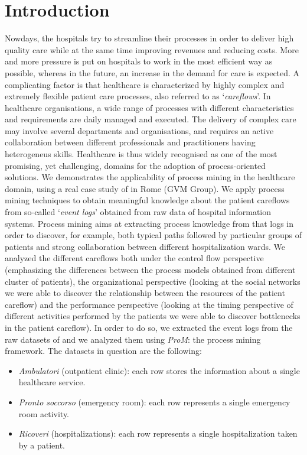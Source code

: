 \section{Introduction}
Nowdays, the hospitals try to streamline their processes in order to deliver high quality care while at the same time improving revenues and reducing costs. More and more pressure is put on hospitals to work in the most efficient way as possible, whereas in the future, an increase in the demand for care is expected. A complicating factor is that healthcare is characterized by highly complex and extremely flexible patient care processes, also referred to as `\textit{careflows}'. In healthcare organisations, a wide range of processes with different characteristics and requirements are daily managed and executed. The delivery of complex care may involve several departments and organisations, and requires an active collaboration between different professionals and practitioners having heterogeneus skills. Healthcare is thus widely recognised as one of the most promising, yet challenging, domains for the adoption of process-oriented solutions. We demonstrates the applicability of process mining in the healthcare domain, using a real case study of \hospital in Rome (GVM Group). We apply process mining techniques to obtain meaningful knowledge about the patient careflows from so-called `\textit{event logs}' obtained from raw data of hospital information systems. Process mining aims at extracting process knowledge from that logs in order to discover, for example, both typical paths followed by particular groups of patients and strong collaboration between different hospitalization wards. We analyzed the different careflows both under the control flow perspective (emphasizing the differences between the process models obtained from different cluster of patients), the organizational perspective (looking at the social networks we were able to discover the relationship between the resources of the patient careflow) and the performance perspective (looking at the timing perspective of different activities performed by the patients we were able to discover bottlenecks in the patient careflow). In order to do so, we extracted the event logs from the raw datasets of \hospital and we analyzed them using \textit{ProM}: the process mining framework. The datasets in question are the following:
\begin{itemize}
\item \textit{Ambulatori} (outpatient clinic): each row stores the information about a single healthcare service.
\item \textit{Pronto soccorso} (emergency room): each row represents a single emergency room activity.
\item \textit{Ricoveri} (hospitalizations): each row represents a single hospitalization taken by a patient.
\end{itemize}
